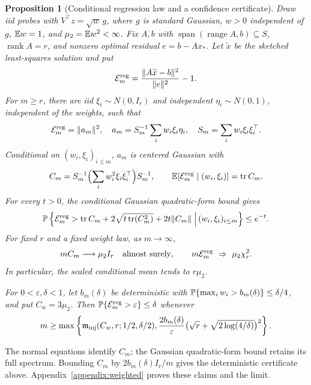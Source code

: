 \documentclass[11pt,a4paper]{article}
\newtheorem{proposition}[theorem]{Proposition}
\theoremstyle{definition}\newtheorem{definition}[theorem]{Definition}
\theoremstyle{remark}\newtheorem{remark}[theorem]{Remark}
\numberwithin{equation}{section}
\newcommand{\norm}[1]{\lVert#1\rVert}\newcommand{\ip}[2]{\langle#1,#2\rangle}
\DeclareMathOperator{\tr}{tr}\DeclareMathOperator{\rank}{rank}
\DeclareMathOperator{\range}{range}\DeclareMathOperator{\diag}{diag}
\begin{document}
\begin{proposition}[Conditional regression law and a confidence certificate]
\label{weighted:prop}
Draw iid probes with $V^\top z=\sqrt w\,g$, where $g$ is standard Gaussian,
$w>0$ independent of $g$, $\mathbb E w=1$, and
$\mu_2=\mathbb E w^2<\infty$. Fix $A,b$ with
$\operatorname{span}(\range A,b)\subseteq S$, $\rank A=r$, and
nonzero optimal residual $e=b-Ax_*$.
Let $\widetilde x$ be the sketched least-squares solution and put
\[
 \mathcal E_m^{\rm reg}=\frac{\norm{A\widetilde x-b}^2}{\norm e^2}-1.
\]
For $m\ge r$, there are iid $\xi_i\sim N(0,I_r)$ and
independent $\eta_i\sim N(0,1)$, independent of the weights, such that
\begin{equation}\label{weighted:eq:law}
 \mathcal E_m^{\rm reg}=\norm{a_m}^2,\quad
 a_m=S_m^{-1}\sum_iw_i\xi_i\eta_i,\quad
 S_m=\sum_iw_i\xi_i\xi_i^\top.
\end{equation}
Conditional on $(w_i,\xi_i)_{i\le m}$, $a_m$ is centered Gaussian with
\begin{equation}\label{weighted:eq:covariance}
 C_m=S_m^{-1}\Bigl(\sum_iw_i^2\xi_i\xi_i^\top\Bigr)S_m^{-1},
 \qquad \E[\mathcal E_m^{\rm reg}\mid(w_i,\xi_i)]=\tr C_m.
\end{equation}
For every $t>0$, the conditional Gaussian quadratic-form bound gives
\begin{equation}\label{weighted:eq:conditional-tail}
 \Pp\left\{\mathcal E_m^{\rm reg}>\tr C_m+
       2\sqrt{t\tr(C_m^2)}+2t\norm{C_m}
       \;\middle|\,(w_i,\xi_i)_{i\le m}\right\}\le e^{-t}.
\end{equation}
For fixed $r$ and a fixed weight law, as $m\to\infty$,
\[
 mC_m\longrightarrow\mu_2I_r\quad\hbox{almost surely},\qquad
 m\mathcal E_m^{\rm reg}\ \Rightarrow\ \mu_2\chi_r^2.
\]
In particular, the scaled conditional mean tends to $r\mu_2$.

For $0<\varepsilon,\delta<1$, let $b_m(\delta)$ be deterministic with
$\mathbb P\{\max_iw_i>b_m(\delta)\}\le\delta/4$, and put $C_w=3\mu_2$.
Then $\mathbb P\{\mathcal E_m^{\rm reg}>\varepsilon\}\le\delta$ whenever
\begin{equation}\label{weighted:eq:budget}
 m\ge\max\left\{\mathfrak m_{\rm inj}(C_w,r;1/2,\delta/2),
 \frac{2b_m(\delta)}{\varepsilon}
     \bigl(\sqrt r+\sqrt{2\log(4/\delta)}\bigr)^2\right\}.
\end{equation}
\end{proposition}
The normal equations identify $C_m$; the Gaussian quadratic-form
bound retains its full spectrum. Bounding $C_m$ by
$2b_m(\delta)I_r/m$ gives the deterministic certificate above.
Appendix~\ref{appendix:weighted} proves these claims and the limit.
\end{document}
